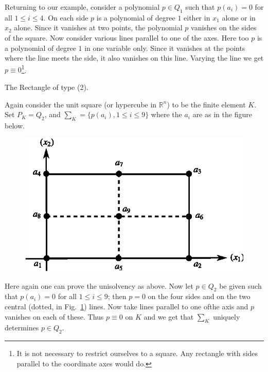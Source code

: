 \begin{example}
Returning to our example, consider a polynomial $p\in Q_{1}$ such that
$p(a_{i})=0$ for all $1\leq i\leq 4$. On each side $p$ is a polynomial
of degree $1$ either in $x_{1}$ alone or in $x_{2}$ alone. Since it
vanishes at two points, the polynomial $p$ vanishes on the sides of
the square. Now consider various lines parallel to one of the
axes. Here too $p$ is a polynomial of degree $1$ in one variable
only. Since it vanishes at the points where the line meets the side,
it also vanishes on this line. Varying the line we get $p\equiv
0$\footnote[1]{It is not necessary to restrict ourselves to a
  square. Any rectangle with sides parallel to the coordinate axes
  would do.}.  
\end{example}


\begin{example}\label{chap4-exam4.5}
The Rectangle of type (2).

Again consider the unit square (or hypercube in $\mathbb{R}^{n}$) to
be the finite element $K$. Set $P_{K}=Q_{2}$, and
$\sum_{K}=\{p(a_{i}),1\leq i\leq 9\}$ where the $a_{i}$ are as in the
figure below.
\begin{figure}[H]
\centering
\includegraphics{figure/fig4.5.eps}
\caption{}\label{chap4-fig4.5}
\end{figure}

Here again one can prove the unisolvency as above. Now let $p\in
Q_{2}$ be given such that $p(a_{i})=0$ for all $1\leq i\leq 9$; then
$p=0$ on the four sides and on the two central (dotted, in
Fig.~\ref{chap4-fig4.5}) lines. Now take lines parallel to one
of\pageoriginale the axis and $p$ vanishes on each of these. Thus
$p\equiv 0$ on $K$ and we get that $\sum_{K}$ uniquely determines
$p\in Q_{2}$.
\end{example}

